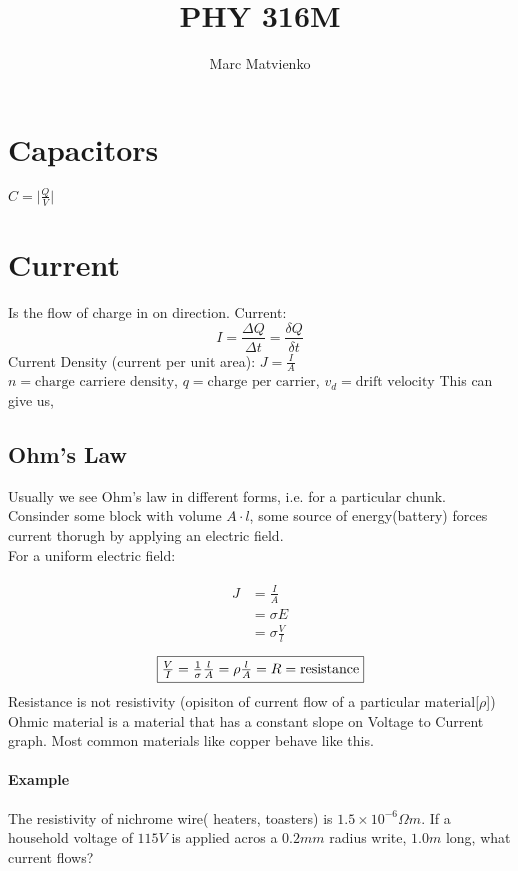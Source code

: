 \documentclass{article}
\title{PHY 316M}
\author{Marc Matvienko}
\begin{document}
    \maketitle %
    \tableofcontents
    \section{Capacitors}
    $C = \lvert\frac{Q}{V}\rvert$

    \section{Current}
    Is the flow of charge in on direction.
    Current: $$I=\frac{\Delta Q}{\Delta t} =\frac{\delta Q}{\delta t}$$
    Current Density (current per unit area): $J = \frac{I}{A}$\\
    $n = \text{charge carriere density}$, $q = \text{charge per carrier}$, $v_d = \text{drift velocity}$
    This can give us, 
    
    \subsection{Ohm's Law}
    Usually we see Ohm's law in different forms, i.e. for a particular chunk.\\
    Consinder some block with volume $A \cdot l$, some source of energy(battery) forces current thorugh by applying an electric field.\\
    For a uniform electric field: 
    
    \begin{align*}
        \begin{split}
            J &= \frac{I}{A} \\
            &= \sigma E \\
            &= \sigma \frac{V}{l}
        \end{split}
    \end{align*}
    $$\boxed{$$\frac{V}{I} = \frac{1}{\sigma} \frac{l}{A} = \rho \frac{l}{A} = R = \text{resistance}$$}$$
    Resistance is not resistivity (opisiton of current flow of a particular material[$\rho$])
    Ohmic material is a material that has a constant slope on Voltage to Current graph. Most common materials like copper behave like this.
    \paragraph{Example} The resistivity of nichrome wire( heaters, toasters) is $1.5 \times 10^{-6}\Omega m$. 
    If a household voltage of $115V$ is applied acros a $0.2mm$ radius write, $1.0m$ long, what current flows?
\end{document}
